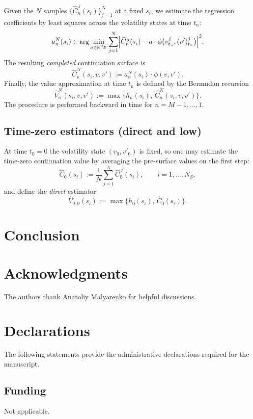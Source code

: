 \documentclass[10pt]{article}
\theoremstyle{plain}
\theoremstyle{definition}
\theoremstyle{remark}
\newcommand{\R}{\mathbb R}
\begin{document}
Given the $N$ samples $\{\widehat C^{\,j}_n(s_i)\}_{j=1}^N$ at a fixed $s_i$, we estimate the regression coefficients by
least squares across the volatility states at time $t_n$:
\begin{equation}\label{eq:regression}
a_n^N(s_i)\in\arg\min_{a\in\R^{d_B}}
\sum_{j=1}^N\Bigl|\widehat C^{\,j}_n(s_i)-a\cdot \phi\bigl(v^{j}_{t_n},(v')^{j}_{t_n}\bigr)\Bigr|^2.
\end{equation}
The resulting \emph{completed} continuation surface is
\[
\widehat C_n^N(s_i,v,v'):=a_n^N(s_i)\cdot\phi(v,v').
\]
Finally, the value approximation at time $t_n$ is defined by the Bermudan recursion
\[
\widehat V_n^N(s_i,v,v'):=\max\bigl\{h_n(s_i),\,\widehat C_n^N(s_i,v,v')\bigr\}.
\]
The procedure is performed backward in time for $n=M-1,\dots,1$.

\subsection{Time-zero estimators (direct and low)}

At time $t_0=0$ the volatility state $(v_0,v'_0)$ is fixed, so one may estimate the time-zero continuation value by
averaging the pre-surface values on the first step:
\[
\widehat C_0(s_i)
:=\frac1N\sum_{j=1}^N \widehat C^{\,j}_0(s_i),
\qquad i=1,\dots,N_S,
\]
and define the \emph{direct} estimator
\[
\widehat V_{d,0}(s_i):=\max\{h_0(s_i),\,\widehat C_0(s_i)\}.
\]

\section{Conclusion}\label{sec:conclusion}



\section*{Acknowledgments}
The authors thank Anatoliy Malyarenko for helpful discussions.

\section*{Declarations}

The following statements provide the administrative declarations required for the manuscript.

\subsection*{Funding}
Not applicable.
\end{document}
